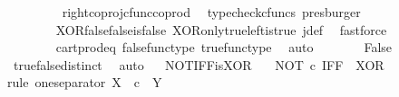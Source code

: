 \begin{isabellebody}
\ \ \ \ \ \ \isamarkupfalse%
\ \ right{\isacharunderscore}{\kern0pt}coproj{\isacharunderscore}{\kern0pt}cfunc{\isacharunderscore}{\kern0pt}coprod\ \isamarkupfalse%
\ {\isacharparenleft}{\kern0pt}typecheck{\isacharunderscore}{\kern0pt}cfuncs{\isacharcomma}{\kern0pt}\ presburger{\isacharparenright}{\kern0pt}\isanewline
\ \ \ \ \isamarkupfalse%
\ \isamarkupfalse%
\ {\isachardoublequoteopen}{\isasymlangle}{\isasymf}{\isacharcomma}{\kern0pt}{\isasymt}{\isasymrangle}\ {\isacharequal}{\kern0pt}\ {\isasymlangle}{\isasymf}{\isacharcomma}{\kern0pt}\ {\isasymf}{\isasymrangle}{\isachardoublequoteclose}\isanewline
\ \ \ \ \ \ \isamarkupfalse%
\ XOR{\isacharunderscore}{\kern0pt}false{\isacharunderscore}{\kern0pt}false{\isacharunderscore}{\kern0pt}is{\isacharunderscore}{\kern0pt}false\ XOR{\isacharunderscore}{\kern0pt}only{\isacharunderscore}{\kern0pt}true{\isacharunderscore}{\kern0pt}left{\isacharunderscore}{\kern0pt}is{\isacharunderscore}{\kern0pt}true\ j{\isacharunderscore}{\kern0pt}def\ \isamarkupfalse%
\ fastforce\isanewline
\ \ \ \ \isamarkupfalse%
\ \isamarkupfalse%
\ {\isachardoublequoteopen}{\isasymt}\ {\isacharequal}{\kern0pt}\ {\isasymf}{\isachardoublequoteclose}\isanewline
\ \ \ \ \ \ \isamarkupfalse%
\ cart{\isacharunderscore}{\kern0pt}prod{\isacharunderscore}{\kern0pt}eq{}\ false{\isacharunderscore}{\kern0pt}func{\isacharunderscore}{\kern0pt}type\ true{\isacharunderscore}{\kern0pt}func{\isacharunderscore}{\kern0pt}type\ \isamarkupfalse%
\ auto\isanewline
\ \ \ \ \isamarkupfalse%
\ \isamarkupfalse%
\ False\isanewline
\ \ \ \ \ \ \isamarkupfalse%
\ true{\isacharunderscore}{\kern0pt}false{\isacharunderscore}{\kern0pt}distinct\ \isamarkupfalse%
\ auto\isanewline
\ \isamarkupfalse%
\isanewline
{}\isamarkupfalse%
%
\endisatagproof
{\isafoldproof}%
%
\isadelimproof
\isanewline
%
\endisadelimproof
\isanewline
{}\isamarkupfalse%
\ NOT{\isacharunderscore}{\kern0pt}IFF{\isacharunderscore}{\kern0pt}is{\isacharunderscore}{\kern0pt}XOR{\isacharcolon}{\kern0pt}\ \isanewline
\ \ {\isachardoublequoteopen}NOT\ {\isasymcirc}\isactrlsub c\ IFF\ {\isacharequal}{\kern0pt}\ XOR{\isachardoublequoteclose}\isanewline
%
\isadelimproof
%
\endisadelimproof
%
\isatagproof
{}\isamarkupfalse%
{\isacharparenleft}{\kern0pt}rule\ one{\isacharunderscore}{\kern0pt}separator{\isacharbrackleft}{\kern0pt}\ X\ {\isacharequal}{\kern0pt}\ {\isachardoublequoteopen}{\isasymOmega}{\isasymtimes}\isactrlsub c{\isasymOmega}{\isachardoublequoteclose}{\isacharcomma}{\kern0pt}\ \ Y\ {\isacharequal}{\kern0pt}\ {\isachardoublequoteopen}{\isasymOmega}{\isachardoublequoteclose}{\isacharbrackright}{\kern0pt}{\isacharparenright}{\kern0pt}\isanewline

\end{isabellebody}
